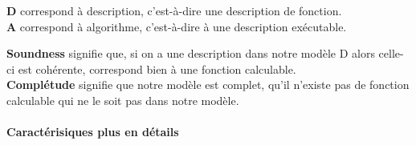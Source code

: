 \begin{myrem}
	\textbf{D} correspond à description, c'est-à-dire une description de fonction.\\
	\textbf{A} correspond à algorithme, c'est-à-dire à une description
	exécutable.
\end{myrem}

\begin{myrem}
	\textbf{Soundness} signifie que, si on a une description dans notre modèle D alors
	celle-ci est cohérente, correspond bien à une fonction
	calculable.\\
	\textbf{Complétude} signifie que notre modèle est complet, qu'il
	n'existe pas de fonction calculable qui ne le soit pas dans notre
	modèle.
\end{myrem}

\paragraph{Caractérisiques plus en détails}
